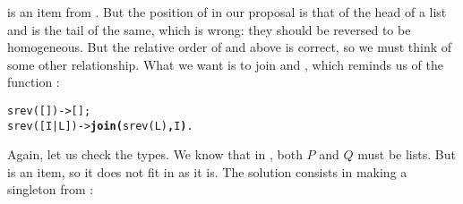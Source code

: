 is an item from \erlcode{[I|L]}. But the position of
 in our proposal is that of the head of a list and
 is the tail of the same, which is wrong: they should be
reversed to be homogeneous. But the relative order of
 and  above is correct, so we must think
of some other relationship. What we want is to join 
and , which reminds us of the function :
\begin{alltt}
srev(   []) -> [];
srev([I|L]) -> \textbf{join(}srev(L)\textbf{,}I\textbf{)}.\hfill% \emph{Still...}
\end{alltt}
Again, let us check the types. We know that in
, both \(P\) and \(Q\) must be lists. But
 is an item, so it does not fit in as it is. The solution
consists in making a singleton from :\label{code:srev}



